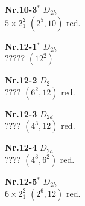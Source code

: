 \documentclass[12pt]{article}
\begin{document}
{\begin{minipage}[t]{3.5cm}
\centering
\epsfxsize=2.5cm
\par
{{\bf Nr.10-3${}^*$} \quad $D_{2h}$\\ $5\times 2^2_1$ \quad $(2^5,10)$ red.\\\vspace{3mm} }
\end{minipage}
\setlength{\unitlength}{1cm}
\begin{minipage}[t]{3.5cm}
\centering
\epsfxsize=2.5cm
\par
{{\bf Nr.12-1${}^*$} \quad $D_{2h}$\\ $?????$ \quad $(12^2)$\\\vspace{3mm} }
\end{minipage}
\setlength{\unitlength}{1cm}
\begin{minipage}[t]{3.5cm}
\centering
\epsfxsize=2.5cm
\par
{{\bf Nr.12-2} \quad $D_2$\\ $????$ \quad $(6^2,12)$ red.\\\vspace{3mm} }
\end{minipage}
\setlength{\unitlength}{1cm}
\begin{minipage}[t]{3.5cm}
\centering
\epsfxsize=2.5cm
\par
{{\bf Nr.12-3} \quad $D_{2d}$\\ $????$ \quad $(4^3,12)$ red.\\\vspace{3mm} }
\end{minipage}
\setlength{\unitlength}{1cm}
\begin{minipage}[t]{3.5cm}
\centering
\epsfxsize=2.5cm
\par
{{\bf Nr.12-4} \quad $D_{2h}$\\ $????$ \quad $(4^3,6^2)$ red.\\\vspace{3mm} }
\end{minipage}
\setlength{\unitlength}{1cm}
\begin{minipage}[t]{3.5cm}
\centering
\epsfxsize=2.5cm
\par
{{\bf Nr.12-5${}^*$} \quad $D_{2h}$\\ $6\times 2^2_1$ \quad $(2^6,12)$ red.\\\vspace{3mm} }
\end{minipage}
}
\end{document}
